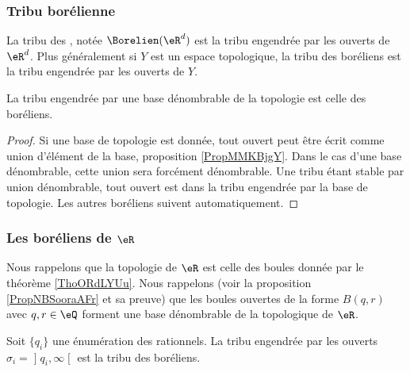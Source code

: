 \subsubsection{Tribu borélienne}

\begin{definition}
    La tribu des , notée \( \Borelien(\eR^d)\) est la tribu engendrée par les ouverts de \( \eR^d\). Plus généralement si \( Y\) est un espace topologique, la tribu des boréliens est la tribu engendrée par les ouverts de \( Y\).
\end{definition}

\begin{proposition} \label{LemYEkvbWBz}
    La tribu engendrée par une base dénombrable de la topologie est celle des boréliens.
\end{proposition}

\begin{proof}
    Si une base de topologie est donnée, tout ouvert peut être écrit comme union d'élément de la base, proposition \ref{PropMMKBjgY}. Dans le cas d'une base dénombrable, cette union sera forcément dénombrable. Une tribu étant stable par union dénombrable, tout ouvert est dans la tribu engendrée par la base de topologie. Les autres boréliens suivent automatiquement.
\end{proof}

\subsubsection{Les boréliens de \texorpdfstring{$ \eR$}{R}}

Nous rappelons que la topologie de \( \eR\) est celle des boules donnée par le théorème \ref{ThoORdLYUu}. Nous rappelons (voir la proposition \ref{PropNBSooraAFr} et sa preuve) que les boules ouvertes de la forme \( B(q,r)\) avec \( q,r\in \eQ\) forment une base dénombrable de la topologique de \( \eR\).

\begin{lemma}   \label{LemZXnAbtl}
    Soit \( \{ q_i \}\) une énumération des rationnels. La tribu engendrée par les ouverts \( \sigma_i=\mathopen] q_i , \infty \mathclose[\) est la tribu des boréliens.
\end{lemma}

